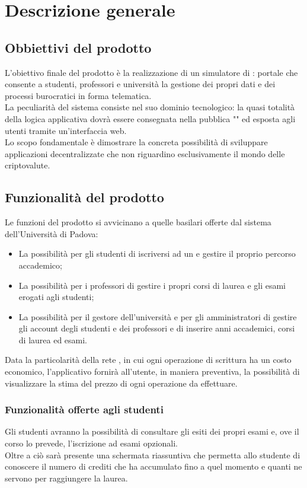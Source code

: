 \documentclass[AnalisiDeiRequisiti.tex]{subfiles}
\begin{document}
\chapter{Descrizione generale}
\section{Obbiettivi del prodotto}
L'obiettivo finale del prodotto è la realizzazione di un simulatore di : portale che consente a studenti, professori e università la gestione dei propri dati e dei processi burocratici in forma telematica. \\
La peculiarità del sistema consiste nel suo dominio tecnologico: la quasi totalità della logica applicativa dovrà essere consegnata nella  pubblica "" ed esposta agli utenti tramite un'interfaccia web. \\
Lo scopo fondamentale è dimostrare la concreta possibilità di sviluppare applicazioni decentralizzate che non riguardino esclusivamente il mondo delle criptovalute.

\section{Funzionalità del prodotto}
Le funzioni del prodotto si avvicinano a quelle basilari offerte dal sistema  dell'Università di Padova:
\begin{itemize}
	\item La possibilità per gli studenti di iscriversi ad un  e gestire il proprio percorso accademico;
	\item La possibilità per i professori di gestire i propri corsi di laurea e gli esami erogati agli studenti;
	\item La possibilità per il gestore dell'università e per gli amministratori di gestire gli account degli studenti e dei professori e di inserire anni accademici, corsi di laurea ed esami.
\end{itemize}
Data la particolarità della rete , in cui ogni operazione di scrittura ha un costo economico, l'applicativo fornirà all'utente, in maniera preventiva, la possibilità di visualizzare la stima del prezzo di ogni operazione da effettuare.

\subsection{Funzionalità offerte agli studenti}
Gli studenti avranno la possibilità di consultare gli esiti dei propri esami e, ove il corso lo prevede, l'iscrizione ad esami opzionali.\\
Oltre a ciò sarà presente una schermata riassuntiva che permetta allo studente di conoscere il numero di crediti che ha accumulato fino a quel momento e quanti ne servono per raggiungere la laurea.
\end{document}
